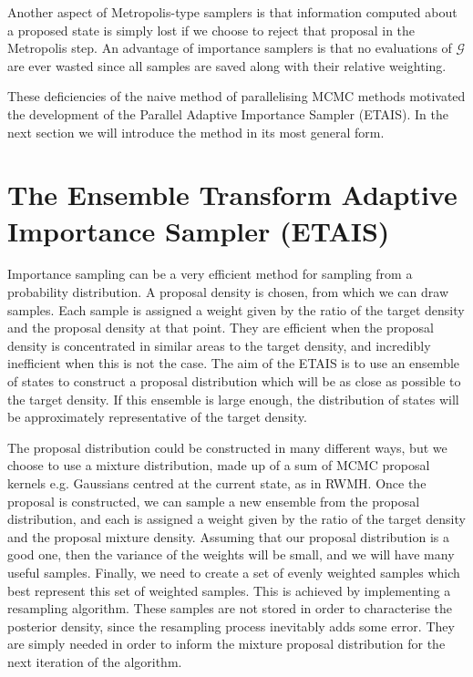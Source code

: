 \documentclass[final]{siamltex}
\begin{document}
Another aspect of Metropolis-type samplers is that information
computed about a proposed state is simply lost if we choose to reject
that proposal in the Metropolis step. An advantage of importance
samplers is that no evaluations of $\mathcal{G}$ are ever wasted
since all samples are saved along with their relative weighting.

These deficiencies of the naive method of parallelising MCMC methods
motivated the development of the Parallel Adaptive Importance Sampler
(ETAIS). In the next section we will introduce the method in its most
general form.


\section{The Ensemble Transform Adaptive Importance Sampler \allowbreak (ETAIS)}\label{Sec:ETAIS}

Importance sampling can be a very efficient method for sampling from a
probability distribution. A proposal density is chosen, from which we
can draw samples. Each sample is assigned a weight given by the
ratio of the target density and the proposal density at that
point. They are efficient when the proposal density is concentrated in
similar areas to the target density, and incredibly inefficient when
this is not the case. The aim of the ETAIS is to use an ensemble of states to construct a proposal
distribution which will be as close as possible to the target density. If this
ensemble is large enough, the distribution of states will be
approximately representative
of the target density.

The proposal distribution could be constructed in many different ways,
but we choose to use a mixture distribution, made up of a sum of MCMC
proposal kernels  e.g. Gaussians centred at the current state, as in RWMH. Once the proposal is constructed, we can
sample a new ensemble from the proposal distribution, and each is
assigned a weight given by the ratio of the target density and the
proposal mixture density. Assuming that our proposal distribution is a
good one, then the variance of the weights will be small, and we will
have many useful samples. Finally, we need to create a set of evenly
weighted samples which best represent this set of weighted samples.
This is achieved by implementing a resampling algorithm. These samples
are not stored in order to characterise the posterior density, since
the resampling process inevitably adds some error. They are
simply needed in order to inform the mixture proposal distribution for the next
iteration of the algorithm. 
\end{document}
